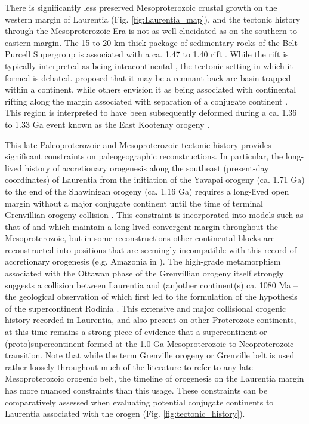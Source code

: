 \documentclass[11pt,letterpaper]{article}
\begin{document}
There is significantly less preserved Mesoproterozoic crustal growth on the western margin of Laurentia (Fig. \ref{fig:Laurentia_map}), and the  tectonic history through the Mesoproterozoic Era is not as well elucidated as on the southern to eastern margin. The 15 to 20 km thick package of sedimentary rocks of the Belt-Purcell Supergroup is associated with a ca. 1.47 to 1.40 rift \citep{Evans2000c}. While the rift is typically interpreted as being intracontinental \citep{Lydon2004a}, the tectonic setting in which it formed is debated. \citet{Hoffman1989a} proposed that it may be a remnant back-arc basin trapped within a continent, while others envision it as being associated with continental rifting along the margin associated with separation of a conjugate continent \citep{Jones2015a}. This region is interpreted to have been subsequently deformed during a ca. 1.36 to 1.33 Ga event known as the East Kootenay orogeny \citep{McMechan1982a, Nesheim2012a, McFarlane2015a}.

This late Paleoproterozoic and Mesoproterozoic tectonic history provides significant constraints on paleogeographic reconstructions. In particular, the long-lived history of accretionary orogenesis along the southeast (present-day coordinates) of Laurentia from the initiation of the Yavapai orogeny (ca. 1.71 Ga) to the end of the Shawinigan orogeny (ca. 1.16 Ga) requires a long-lived open margin without a major conjugate continent until the time of terminal Grenvillian orogeny collision \citep{Karlstrom2001a}. This constraint is incorporated into models such as that of \citet{Zhang2012a} and \citet{Pehrsson2015a} which maintain a long-lived convergent margin throughout the Mesoproterozoic, but in some reconstructions other continental blocks are reconstructed into positions that are seemingly incompatible with this record of accretionary orogenesis (e.g. Amazonia in \citealp{Elming2009a}). The high-grade metamorphism associated with the Ottawan phase of the Grenvillian orogeny itself strongly suggests a collision between Laurentia and (an)other continent(s) ca. 1080 Ma -- the geological observation of which first led to the formulation of the hypothesis of the supercontinent Rodinia \citep{Hoffman1991a}. This extensive and major collisional orogenic history recorded in Laurentia, and also present on other Proterozoic continents, at this time remains a strong piece of evidence that a supercontinent or (proto)supercontinent formed at the 1.0 Ga Mesoproterozoic to Neoproterozoic transition. Note that while the term Grenville orogeny or Grenville belt is used rather loosely throughout much of the literature to refer to any late Mesoproterozoic orogenic belt, the timeline of orogenesis on the Laurentia margin has more nuanced constraints than this usage. These constraints can be comparatively assessed when evaluating potential conjugate continents to Laurentia associated with the orogen (Fig. \ref{fig:tectonic_history}).
\end{document}
